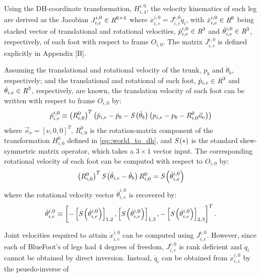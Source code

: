 			Using the DH-coordinate transformation, ${H}^{i,0}_{i,4}$, the velocity kinematics of each \Ith leg are derived as the Jacobian $J^{i,0}_{i,e} \in\emph{R}^{6\times4}$ where $ \dot{x}^{i,0}_{i,e} = J^{i,0}_{i,e}  \dot{q}_{i}$, with $\dot{x}^{i,0}_{i,e} \in\emph{R}^{6}$ being stacked vector of translational and rotational velocities, $\dot{p}_{i,e}^{i,0} \in\emph{R}^{3}$ and $\dot{\theta}_{i,e}^{i,0}\in\emph{R}^{3}$, respectively, of each \Ith foot with respect to frame $O_{i,0}$. The matrix $J^{i,0}_{i,e}$ is defined explicitly in Appendix [B].

			Assuming the translational and rotational velocity of the trunk, $\dot{p}_{b}$ and $\dot{\theta}_{b}$, respectively; and the translational and rotational of each \Ith foot, $\dot{p}_{i,e} \in\emph{R}^{3}$ and $\dot{\theta}_{i,e} \in\emph{R}^{3}$, respectively, are known, the translation velocity of each \Ith foot can be written with respect to frame $O_{i,0}$ by:
				\begin{equation}
					\dot{p}_{i,e}^{i,0} \equiv \left(R^{0}_{i,0}\right)^{T} \left( \dot{p}_{i,e} - \dot{p}_{b} - \emph{S}\left( \dot{\theta}_{b} \right) \left( {p}_{i,e} - {p}_{b} - R^{0}_{i,0} \vec{o}_{\nu} \right) \right)
				\end{equation}
			where $\vec{o}_{\nu} = [\nu,0,0]^{T}$, $R^{0}_{i,0}$ is the rotation-matrix component of the transformation $H^{0}_{i,0}$ defined in \ref{eq::world_to_dh}, and $\emph{S}\left(*\right)$ is the standard skew-symmetric matrix operator, which takes a $3\times1$ vector input. The corresponding rotational velocity of each \Ith foot  can be computed with respect to $O_{i,0}$ by:
				\begin{equation}
					\left( R^{0}_{i,0} \right)^{T} \emph{S}\left( \dot{\theta}_{i,e} - \dot{\theta}_{b} \right) R^{0}_{i,0}  = \emph{S}\left( \dot{\theta}^{i,0}_{i,e} \right)
				\end{equation}
			where the rotational velocity vector $\dot{\theta}^{i,0}_{i,e}$ is recovered by:
				\begin{equation}
					\dot{\theta}^{i,0}_{i,e} \equiv \left[ 
						-\left[\emph{S}\left( \dot{\theta}^{i,0}_{i,e} \right)\right]_{1,2},
						 \left[\emph{S}\left( \dot{\theta}^{i,0}_{i,e} \right)\right]_{1,3},
						-\left[\emph{S}\left( \dot{\theta}^{i,0}_{i,e} \right)\right]_{2,3}
					\right]^{T}.
				\end{equation}

			Joint velocities required to attain $\dot{x}^{i,0}_{i,e}$ can be computed using $J^{i,0}_{i,e}$. However, since each of BlueFoot's of legs had 4 degrees of freedom, $J^{i,0}_{i,e}$ is rank deficient and $\dot{q}_{i}$ cannot be obtained by direct inversion. Instead, $\dot{q}_{i}$ can be obtained from $\dot{x}^{i,0}_{i,e}$ by the psuedo-inverse of  





